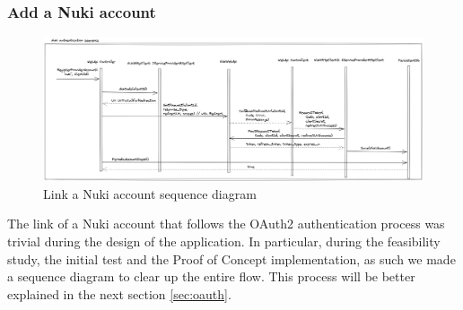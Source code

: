 \subsubsection{Add a Nuki account}
\begin{figure}[ht]
    \centering
    \includegraphics[width=\textwidth]{figures/nukiadd.excalidraw.png}
    \caption{Link a Nuki account sequence diagram}
    \label{fig:accountsequence}
\end{figure}
The link of a Nuki account that follows the OAuth2 authentication process was trivial during the design of the application. In particular, during the feasibility study, the initial test and the Proof of Concept implementation, as such we made a sequence diagram to clear up the entire flow. This process will be better explained in the next section \ref{sec:oauth}.

